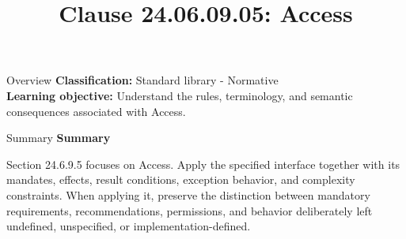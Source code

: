 \documentclass[10pt,letterpaper]{article}
\title{Clause 24.06.09.05: Access}
\author{}
\date{}
\begin{document}
\maketitle
\begin{CornellOverviewBox}{Overview}
\textbf{Classification:} Standard library - Normative\\[2pt]
\textbf{Learning objective:} Understand the rules, terminology, and semantic consequences associated with Access.
\end{CornellOverviewBox}\begin{CornellSummaryBox}{Summary}
{\sffamily\bfseries\color{Accent} Summary}\par\vspace{3pt}Section 24.6.9.5 focuses on Access. Apply the specified interface together with its mandates, effects, result conditions, exception behavior, and complexity constraints. When applying it, preserve the distinction between mandatory requirements, recommendations, permissions, and behavior deliberately left undefined, unspecified, or implementation-defined.
\end{CornellSummaryBox}
\end{document}
